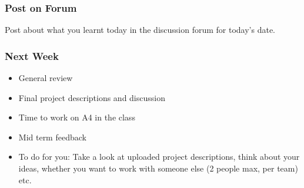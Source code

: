 \documentclass{beamer}
\begin{document}
\begin{frame}
\frametitle{Post on Forum}
Post about what you learnt today in the discussion forum for today's date.
\end{frame}

\begin{frame}
\frametitle{Next Week}
\begin{itemize}
\item General review
\item Final project descriptions and discussion
\item Time to work on A4 in the class
\item Mid term feedback
\item To do for you: Take a look at uploaded project descriptions, think about your ideas, whether you want to work with someone else (2 people max, per team) etc.
\end{itemize}
\end{frame}
\end{document}
